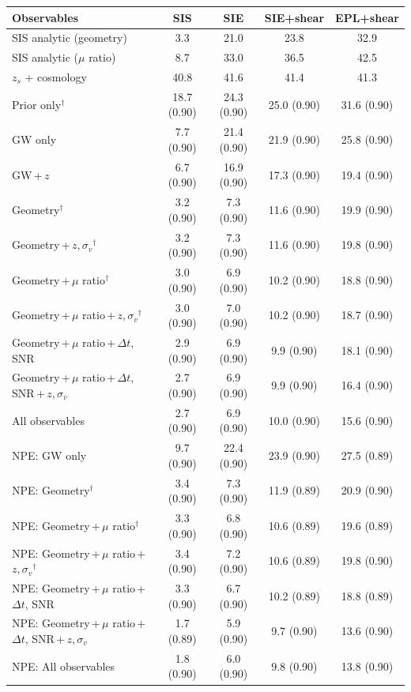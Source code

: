 \begin{tabular*}{\linewidth}{@{\extracolsep{\fill}}lcccc@{}}
\toprule
Observables & SIS & SIE & SIE+shear & EPL+shear \\
\midrule
SIS analytic (geometry) & 3.3 & 21.0 & 23.8 & 32.9 \\
SIS analytic ($\mu$ ratio) & 8.7 & 33.0 & 36.5 & 42.5 \\
$z_s$ + cosmology & 40.8 & 41.6 & 41.4 & 41.3 \\
\midrule
Prior only$^\dagger$ & 18.7 (0.90) & 24.3 (0.90) & 25.0 (0.90) & 31.6 (0.90) \\
GW only & 7.7 (0.90) & 21.4 (0.90) & 21.9 (0.90) & 25.8 (0.90) \\
GW\,+\,$z$ & 6.7 (0.90) & 16.9 (0.90) & 17.3 (0.90) & 19.4 (0.90) \\
Geometry$^\dagger$ & 3.2 (0.90) & 7.3 (0.90) & 11.6 (0.90) & 19.9 (0.90) \\
Geometry\,+\,$z,\sigma_v$$^\dagger$ & 3.2 (0.90) & 7.3 (0.90) & 11.6 (0.90) & 19.8 (0.90) \\
Geometry\,+\,$\mu$ ratio$^\dagger$ & 3.0 (0.90) & 6.9 (0.90) & 10.2 (0.90) & 18.8 (0.90) \\
Geometry\,+\,$\mu$ ratio\,+\,$z,\sigma_v$$^\dagger$ & 3.0 (0.90) & 7.0 (0.90) & 10.2 (0.90) & 18.7 (0.90) \\
Geometry\,+\,$\mu$ ratio\,+\,$\Delta t$, SNR & 2.9 (0.90) & 6.9 (0.90) & 9.9 (0.90) & 18.1 (0.90) \\
Geometry\,+\,$\mu$ ratio\,+\,$\Delta t$, SNR\,+\,$z,\sigma_v$ & 2.7 (0.90) & 6.9 (0.90) & 9.9 (0.90) & 16.4 (0.90) \\
All observables & 2.7 (0.90) & 6.9 (0.90) & 10.0 (0.90) & 15.6 (0.90) \\
\midrule
NPE: GW only & 9.7 (0.90) & 22.4 (0.90) & 23.9 (0.90) & 27.5 (0.89) \\
NPE: Geometry$^\dagger$ & 3.4 (0.90) & 7.3 (0.90) & 11.9 (0.89) & 20.9 (0.90) \\
NPE: Geometry\,+\,$\mu$ ratio$^\dagger$ & 3.3 (0.90) & 6.8 (0.90) & 10.6 (0.89) & 19.6 (0.89) \\
NPE: Geometry\,+\,$\mu$ ratio\,+\,$z,\sigma_v$$^\dagger$ & 3.4 (0.90) & 7.2 (0.90) & 10.6 (0.89) & 19.8 (0.90) \\
NPE: Geometry\,+\,$\mu$ ratio\,+\,$\Delta t$, SNR & 3.3 (0.90) & 6.7 (0.90) & 10.2 (0.89) & 18.8 (0.89) \\
NPE: Geometry\,+\,$\mu$ ratio\,+\,$\Delta t$, SNR\,+\,$z,\sigma_v$ & 1.7 (0.89) & 5.9 (0.90) & 9.7 (0.90) & 13.6 (0.90) \\
NPE: All observables & 1.8 (0.90) & 6.0 (0.90) & 9.8 (0.90) & 13.8 (0.90) \\
\bottomrule
\end{tabular*}